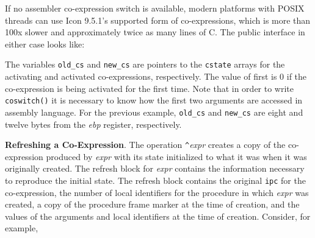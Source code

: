 \goodbreak
{}

If no assembler co-expression switch is available, modern platforms
with POSIX threads can use Icon 9.5.1's supported form of
co-expressions, which is more than 100x slower and approximately twice
as many lines of C. The public interface in either case looks like:


The variables \texttt{old\_cs} and \texttt{new\_cs} are pointers to
the \texttt{cstate} arrays for the activating and activated
co-expressions, respectively. The value of first is 0 if the
co-expression is being activated for the first time. Note that in
order to write \texttt{coswitch()} it is necessary to know how the
first two arguments are accessed in assembly language. For the
previous example, \texttt{old\_cs} and \texttt{new\_cs} are eight and
twelve bytes from the \textit{ebp }register, respectively.

\textbf{Refreshing a Co-Expression}. The operation
\texttt{\textit{\^{}}}\textit{expr} creates a copy of
the co-expression produced by \textit{expr} with its
state initialized to what it was when it was originally created. The
refresh block for \textit{expr} contains the
information necessary to reproduce the initial state. The refresh
block contains the original \texttt{ipc} for the co-expression, the
number of local identifiers for the procedure in which
\textit{expr} was created, a copy of the procedure
frame marker at the time of creation, and the values of the arguments
and local identifiers at the time of creation. Consider, for example,

